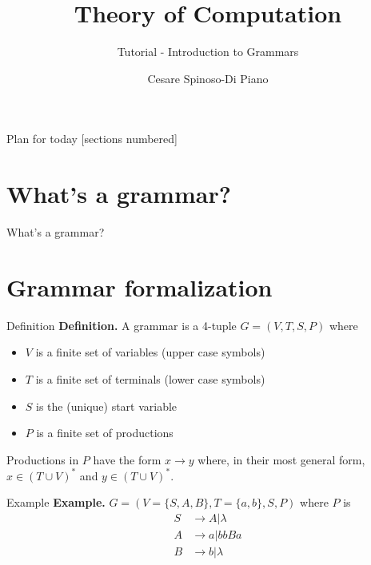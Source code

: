 \documentclass[10pt]{beamer}
\title{Theory of Computation}
\subtitle{Tutorial - Introduction to Grammars}
\author{Cesare Spinoso-Di Piano}
\date{}
\begin{document}
\maketitle

\begin{frame}{Plan for today}
    [sections numbered]
    \tableofcontents[hideallsubsections]
\end{frame}

\section{What's a grammar?}

\begin{frame}{What's a grammar?}

\end{frame}

\section{Grammar formalization}

\begin{frame}{Definition}
    \textbf{Definition.} A grammar is a 4-tuple $G = (V, T, S, P)$ where
    \begin{itemize}
        \item $V$ is a finite set of variables (upper case symbols)
        \item $T$ is a finite set of terminals (lower case symbols)
        \item $S$ is the (unique) start variable
        \item $P$ is a finite set of productions
    \end{itemize}
    Productions in $P$ have the form $x \rightarrow y$ where, in their most general form, $x \in (T \cup V)^*$ and $y \in (T \cup V)^*$.
\end{frame}

\begin{frame}{Example}
    \textbf{Example.} $G = (V=\{S,A,B\},T=\{a,b\},S, P)$ where $P$ is
    \begin{align*}
        S & \rightarrow A|\lambda \\
        A & \rightarrow a|bbBa    \\
        B & \rightarrow b|\lambda
    \end{align*}
\end{frame}
\end{document}
